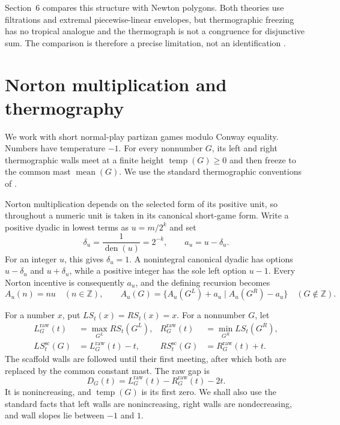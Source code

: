 \documentclass[11pt]{article}
\theoremstyle{definition}
\theoremstyle{remark}
\newcommand{\temp}{\operatorname{temp}}
\newcommand{\mean}{\operatorname{mean}}
\newcommand{\den}{\operatorname{den}}
\begin{document}
Section~6 compares this structure with Newton polygons.  Both theories use
filtrations and extremal piecewise-linear envelopes, but thermographic
freezing has no tropical analogue and the thermograph is not a congruence for
disjunctive sum.  The comparison is therefore a precise limitation, not an
identification \cite{bandokenmorikawa2020,dumas1906}.

\section{Norton multiplication and thermography}

We work with short normal-play partizan games modulo Conway equality.  Numbers
have temperature $-1$.  For every nonnumber $G$, its left and right
thermographic walls meet at a finite height $\temp(G)\ge0$ and then freeze to
the common mast $\mean(G)$.  We use the standard thermographic conventions of
\cite{siegel2013,bandokenmorikawa2020}.

Norton multiplication depends on the selected form of its positive unit, so
throughout a numeric unit is taken in its canonical short-game form.  Write a
positive dyadic in lowest terms as $u=m/2^k$ and set
\begin{equation}
  \delta_u=\frac{1}{\den(u)}=2^{-k},\qquad a_u=u-\delta_u.
\end{equation}
For an integer $u$, this gives $\delta_u=1$.  A nonintegral canonical dyadic
has options $u-\delta_u$ and $u+\delta_u$, while a positive integer has the
sole left option $u-1$.  Every Norton incentive is consequently $a_u$, and
the defining recursion becomes
\begin{equation}
 A_u(n)=nu\quad(n\in\mathbb Z),\qquad
 A_u(G)=\{A_u(G^L)+a_u\mid A_u(G^R)-a_u\}
 \quad(G\notin\mathbb Z).
\end{equation}

For a number $x$, put $LS_t(x)=RS_t(x)=x$.  For a nonnumber $G$, let
\begin{align}
 L_G^{\mathrm{raw}}(t)&=\max_{G^L}RS_t(G^L),&
 R_G^{\mathrm{raw}}(t)&=\min_{G^R}LS_t(G^R),\\
 LS_t^{\mathrm{sc}}(G)&=L_G^{\mathrm{raw}}(t)-t,&
 RS_t^{\mathrm{sc}}(G)&=R_G^{\mathrm{raw}}(t)+t.
\end{align}
The scaffold walls are followed until their first meeting, after which both
are replaced by the common constant mast.  The raw gap is
\begin{equation}
 D_G(t)=L_G^{\mathrm{raw}}(t)-R_G^{\mathrm{raw}}(t)-2t.
\end{equation}
It is nonincreasing, and $\temp(G)$ is its first zero.  We shall also use the
standard facts that left walls are nonincreasing, right walls are
nondecreasing, and wall slopes lie between $-1$ and $1$.
\end{document}

